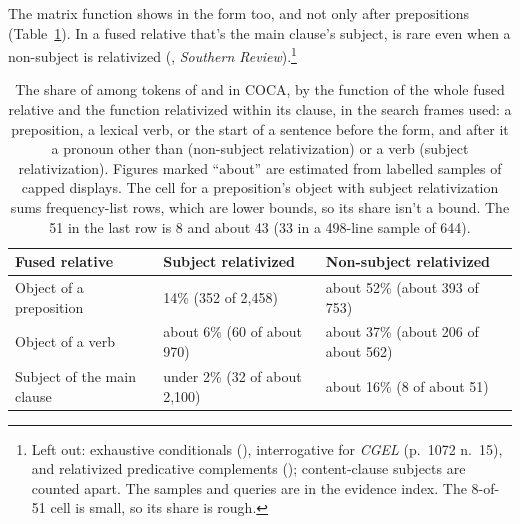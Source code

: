 The matrix function shows in the form too, and not only after prepositions (Table~\ref{tab:case}). In a fused relative that's the main clause's subject,  is rare even when a non-subject is relativized (, \textit{Southern Review}).\footnote{Left out: exhaustive conditionals (), interrogative for \textit{CGEL} (p.~1072 n.~15), and relativized predicative complements (); content-clause subjects are counted apart. The samples and queries are in the evidence index. The 8-of-51 cell is small, so its share is rough.}

\begin{table}[H]
\centering\footnotesize
\caption{The share of  among tokens of  and  in COCA, by the function of the whole fused relative and the function relativized within its clause, in the search frames used: a preposition, a lexical verb, or the start of a sentence before the form, and after it a pronoun other than  (non-subject relativization) or a verb (subject relativization). Figures marked \enquote{about} are estimated from labelled samples of capped displays. The cell for a preposition's object with subject relativization sums frequency-list rows, which are lower bounds, so its share isn't a bound. The 51 in the last row is 8  and about 43  (33 in a 498-line sample of 644).}\label{tab:case}
\begin{tabular}{lll}
\toprule
Fused relative & Subject relativized & Non-subject relativized \\
\midrule
Object of a preposition & 14\% (352 of 2,458) & about 52\% (about 393 of 753) \\
Object of a verb & about 6\% (60 of about 970) & about 37\% (about 206 of about 562) \\
Subject of the main clause & under 2\% (32 of about 2,100) & about 16\% (8 of about 51) \\
\bottomrule
\end{tabular}
\end{table}

